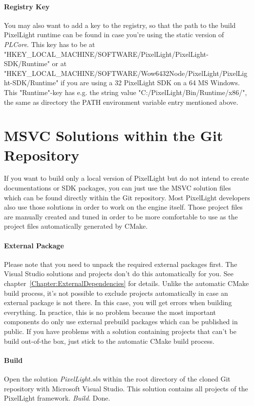 \paragraph{Registry Key}
You may also want to add a key to the registry, so that the path to the build PixelLight runtime can be found in case you're using the static version of \emph{PLCore}. This key has to be at "HKEY\_LOCAL\_MACHINE/SOFTWARE/PixelLight/PixelLight-SDK/Runtime" or at "HKEY\_LOCAL\_MACHINE/SOFTWARE/Wow6432Node/PixelLight/PixelLight-SDK/Runtime" if you are using a \SI{32}{\bit} PixelLight SDK on a \SI{64}{\bit} \ac{MS} Windows. This "Runtime"-key has e.g. the string value "C:/PixelLight/Bin/Runtime/x86/", the same as directory the PATH environment variable entry mentioned above.




\section{\ac{MSVC} Solutions within the Git Repository}
If you want to build only a local version of PixelLight but do not intend to create documentations or \ac{SDK} packages, you can just use the \ac{MSVC} solution files which can be found directly within the Git repository. Most PixelLight developers also use those solutions in order to work on the engine itself. Those project files are manually created and tuned in order to be more comfortable to use as the project files automatically generated by CMake.


\paragraph{External Package}
Please note that you need to unpack the required external packages first. The Visual Studio solutions and projects don't do this automatically for you. See chapter~\ref{Chapter:ExternalDependencies} for details. Unlike the automatic CMake build process, it's not possible to exclude projects automatically in case an external package is not there. In this case, you will get errors when building everything. In practice, this is no problem because the most important components do only use external prebuild packages which can be published in public. If you have problems with a solution containing projects that can't be build out-of-the box, just stick to the automatic CMake build process.


\paragraph{Build}
Open the solution \emph{PixelLight.sln} within the root directory of the cloned Git repository with Microsoft Visual Studio. This solution contains all projects of the PixelLight framework. \emph{Build}. Done.
